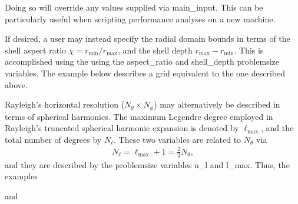 \documentclass[letterpaper,11pt,english]{sphinxmanual}
\begin{document}
\sphinxAtStartPar
Doing so will override any values supplied via main\_input.  This can be particularly useful when scripting performance analyses on a new machine.

\sphinxAtStartPar
If desired, a user may instead specify the radial domain bounds in terms of the shell aspect ratio \(\chi=r_\mathrm{min}/r_\mathrm{max}\), and
the shell depth \(r_\mathrm{max}-r_\mathrm{min}\).  This is accomplished using the using the aspect\_ratio and shell\_depth problemsize variables.  The example below describes a
grid equivalent to the one described above.

\begin{sphinxVerbatim}[commandchars=\\\{\}]
   
   
   
   
\end{sphinxVerbatim}

\sphinxAtStartPar
Rayleigh’s horizontal resolution (\(N_\theta\times N_\phi\)) may alternatively be described in terms of spherical harmonics.  The maximum Legendre degree employed in Rayleigh’s truncated spherical harmonic expansion is denoted by \(\ell_\mathrm{max}\), and the total number of degrees by \(N_\ell\).
These two variables are related to \(N_\theta\) via
\begin{equation*}
\begin{split}N_\ell = \ell_\mathrm{max}+1 = \frac{2}{3}N_\theta,\end{split}
\end{equation*}
\sphinxAtStartPar
and they are described by the problemsize variables n\_l and l\_max.  Thus, the examples

\begin{sphinxVerbatim}[commandchars=\\\{\}]
   
   
   
   
\end{sphinxVerbatim}

\sphinxAtStartPar
and

\begin{sphinxVerbatim}[commandchars=\\\{\}]
   
   
   
   
\end{sphinxVerbatim}
\end{document}
